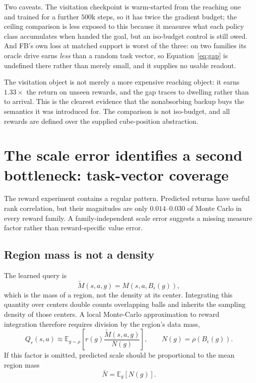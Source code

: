 \documentclass{article}
\newcommand{\E}{\mathbb{E}}
\begin{document}
Two caveats. The visitation checkpoint is warm-started from the reaching one and
trained for a further $500$k steps, so it has twice the gradient budget; the
ceiling comparison is less exposed to this because it measures what each policy
class accumulates when handed the goal, but an iso-budget control is still owed.
And FB's own loss at matched support is worst of the three: on two families its
oracle drive earns \emph{less} than a random task vector, so Equation~\ref{eq:gap}
is undefined there rather than merely small, and it supplies no usable readout.

\begin{finding}
The visitation object is not merely a more expensive reaching object: it earns
$1.33\times$ the return on unseen rewards, and the gap traces to dwelling rather
than to arrival. This is the clearest evidence that the nonabsorbing backup buys
the semantics it was introduced for. The comparison is not iso-budget, and all
rewards are defined over the supplied cube-position abstraction.
\end{finding}

\section{The scale error identifies a second bottleneck: task-vector coverage}
\label{sec:task-vectors}

The reward experiment contains a regular pattern. Predicted returns have useful
rank correlation, but their magnitudes are only $0.014$--$0.030$ of Monte Carlo in
every reward family. A family-independent scale error suggests a missing measure
factor rather than reward-specific value error.

\subsection{Region mass is not a density}
\label{sec:region-normalization}

The learned query is
\begin{equation}
\widetilde M(s,a,g)=M(s,a,B_\epsilon(g)),
\end{equation}
which is the mass of a region, not the density at its center. Integrating this
quantity over centers double counts overlapping balls and inherits the sampling
density of those centers. A local Monte-Carlo approximation to reward integration
therefore requires division by the region's data mass,
\begin{equation}
\label{eq:nhat}
Q_r(s,a)
\approx
\E_{g\sim\rho}
\left[
 r(g)\frac{\widetilde M(s,a,g)}{N(g)}
\right],
\qquad
N(g)=\rho(B_\epsilon(g)).
\end{equation}
If this factor is omitted, predicted scale should be proportional to the mean
region mass
\begin{equation}
\bar N=\E_g[N(g)].
\end{equation}
\end{document}
